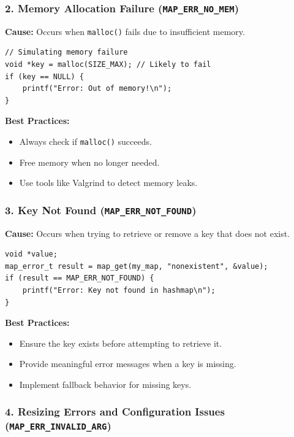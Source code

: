 \documentclass[titlepage]{article}
\begin{document}
\subsubsection{2. Memory Allocation Failure (\texttt{MAP\_ERR\_NO\_MEM})}

\textbf{Cause:}
Occurs when \texttt{malloc()} fails due to insufficient memory.

\begin{verbatim}
// Simulating memory failure
void *key = malloc(SIZE_MAX); // Likely to fail
if (key == NULL) {
    printf("Error: Out of memory!\n");
}
\end{verbatim}

\textbf{Best Practices:}
\begin{itemize}
    \item Always check if \texttt{malloc()} succeeds.
    \item Free memory when no longer needed.
    \item Use tools like Valgrind to detect memory leaks.
\end{itemize}

\subsubsection{3. Key Not Found (\texttt{MAP\_ERR\_NOT\_FOUND})}

\textbf{Cause:}
Occurs when trying to retrieve or remove a key that does not exist.

\begin{verbatim}
void *value;
map_error_t result = map_get(my_map, "nonexistent", &value);
if (result == MAP_ERR_NOT_FOUND) {
    printf("Error: Key not found in hashmap\n");
}
\end{verbatim}

\textbf{Best Practices:}
\begin{itemize}
    \item Ensure the key exists before attempting to retrieve it.
    \item Provide meaningful error messages when a key is missing.
    \item Implement fallback behavior for missing keys.
\end{itemize}

\subsubsection{4. Resizing Errors and Configuration Issues (\texttt{MAP\_ERR\_INVALID\_ARG})}
\end{document}
